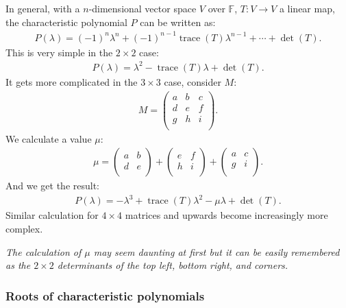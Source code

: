 \documentclass[a4paper, 12pt, twoside]{article}
\DeclareMathOperator{\Tr}{trace}
\begin{document}
In general, with a $n$-dimensional vector space $V$ over 
$\mathbb{F}$, $T:V \to V$ a linear map, the characteristic
polynomial $P$ can be written as:
\begin{align*}
  P(\lambda) = (-1)^n\lambda^n + (-1)^{n-1}\Tr(T)\lambda^{n-1}
  + \cdots + \det(T).
\end{align*}
This is very simple in the $2 \times 2$ case:
\begin{align*}
  P(\lambda) = \lambda^2 - \Tr(T)\lambda + \det(T).
\end{align*}
It gets more complicated in the $3 \times 3$ case, consider $M$:
\begin{gather*}
  M = \begin{pmatrix}
    a & b & c \\
    d & e & f \\
    g & h & i \\
  \end{pmatrix}.
\end{gather*}
We calculate a value $\mu$:
\begin{gather*}
  \mu = \begin{pmatrix}
    a & b \\
    d & e \\
  \end{pmatrix} +
  \begin{pmatrix}
    e & f \\
    h & i \\
  \end{pmatrix} +
  \begin{pmatrix}
    a & c \\
    g & i \\
  \end{pmatrix}.
\end{gather*}
And we get the result:
\begin{align*}
  P(\lambda) = -\lambda^3 + \Tr(T)\lambda^2 - \mu\lambda + \det(T).
\end{align*}
Similar calculation for $4 \times 4$ matrices and upwards become
increasingly more complex.

\vspace{\baselineskip}

\textit{The calculation of $\mu$ may seem daunting at first but
it can be easily remembered as the $2 \times 2$ determinants of
the top left, bottom right, and corners.}

\subsubsection{Roots of characteristic polynomials}
\end{document}
